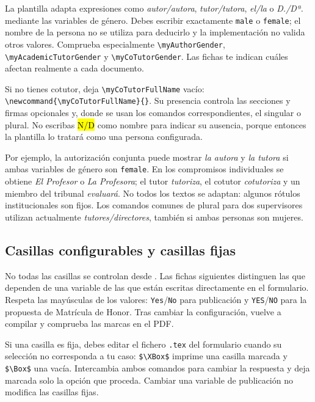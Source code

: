\documentclass[10pt,a4paper]{article}
\newcommand{\variable}[1]{\texttt{\textbackslash{}}\nolinkurl{#1}}
\newcommand{\fichero}[1]{\path{#1}}
\begin{document}
La plantilla adapta expresiones como \emph{autor/autora}, \emph{tutor/tutora}, \emph{el/la} o \emph{D./Dª.} mediante las variables de género. Debes escribir exactamente \texttt{male} o \texttt{female}; el nombre de la persona no se utiliza para deducirlo y la implementación no valida otros valores. Comprueba especialmente \variable{myAuthorGender}, \variable{myAcademicTutorGender} y \variable{myCoTutorGender}. Las fichas te indican cuáles afectan realmente a cada documento.

Si no tienes cotutor, deja \variable{myCoTutorFullName} vacío: \verb|\newcommand{\myCoTutorFullName}{}|. Su presencia controla las secciones y firmas opcionales y, donde se usan los comandos correspondientes, el singular o plural. No escribas \hl{N/D} como nombre para indicar su ausencia, porque entonces la plantilla lo tratará como una persona configurada.

Por ejemplo, la autorización conjunta puede mostrar \emph{la autora} y \emph{la tutora} si ambas variables de género son \texttt{female}. En los compromisos individuales se obtiene \emph{El Profesor} o \emph{La Profesora}; el tutor \emph{tutoriza}, el cotutor \emph{cotutoriza} y un miembro del tribunal \emph{evaluará}. No todos los textos se adaptan: algunos rótulos institucionales son fijos. Los comandos comunes de plural para dos supervisores utilizan actualmente \emph{tutores/directores}, también si ambas personas son mujeres.

\subsection{Casillas configurables y casillas fijas}

No todas las casillas se controlan desde \fichero{Config/myconfig.tex}. Las fichas siguientes distinguen las que dependen de una variable de las que están escritas directamente en el formulario. Respeta las mayúsculas de los valores: \texttt{Yes}/\texttt{No} para publicación y \texttt{YES}/\texttt{NO} para la propuesta de Matrícula de Honor. Tras cambiar la configuración, vuelve a compilar y comprueba las marcas en el PDF.

Si una casilla es fija, debes editar el fichero \texttt{.tex} del formulario cuando su selección no corresponda a tu caso: \verb|$\XBox$| imprime una casilla marcada y \verb|$\Box$| una vacía. Intercambia ambos comandos para cambiar la respuesta y deja marcada solo la opción que proceda. Cambiar una variable de publicación no modifica las casillas fijas.
\end{document}
